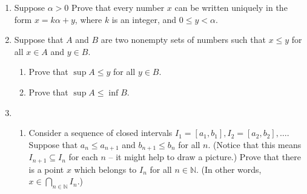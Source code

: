 \documentclass[letterpaper,12pt]{article}
\newcommand{\N}{\mathbb{N}}
\newcommand{\R}{\mathbb{R}}
\newcommand{\abs}[1]{\lvert #1\rvert}
\newcommand{\len}[1]{\lVert #1\Vert}
\begin{document}
\begin{enumerate}
 \item Suppose $\alpha>0$ Prove that every number $x$ can be written uniquely in the form $x=k\alpha+y$, where $k$ is an integer, and $0\leq y<\alpha$. 
 \item Suppose that $A$ and $B$ are two nonempty sets of numbers such that $x\leq y$ for all $x\in A$ and $y\in B$.
\begin{enumerate}
 \item Prove that $\sup A\leq y$ for all $y\in B$.
 \item Prove that $\sup A\leq \inf B$.
\end{enumerate}
 \item \begin{enumerate}
        \item Consider a sequence of closed intervals $I_1 = [a_1,b_1], I_2 = [a_2,b_2], \ldots$. Suppose that $a_n\leq a_{n+1}$ and $b_{n+1}\leq b_n$ for all $n$. (Notice that this means $I_{n+1}\subseteq I_n$ for each $n$ -- it might help to draw a picture.) Prove that there is a point $x$ which belongs to $I_n$ for all $n\in \N$. (In other words, $x\in\bigcap_{n\in \N}I_n$.)

\end{enumerate}
\end{enumerate}
\end{document}
